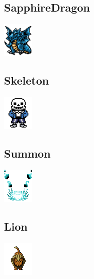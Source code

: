 \documentclass[a4paper,12pt]{scrartcl}
\begin{document}
	\subsection{SapphireDragon}
	\begin{center}\includegraphics{Prog2_EA_V2/Art/SapphireDragon.png}\end{center}
	\subsection{Skeleton}
	\begin{center}\includegraphics{Prog2_EA_V2/Art/Skeleton.png}\end{center}
	\subsection{Summon}
	\begin{center}\includegraphics{Prog2_EA_V2/Art/Summon.png}\end{center}
	\subsection{Lion}
	\begin{center}\includegraphics{Prog2_EA_V2/Art/SummonableCreature_Lion.png}\end{center}
\end{document}
